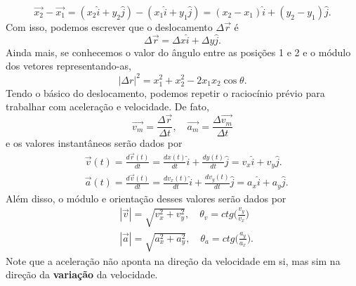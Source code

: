 \documentclass{article}
\begin{document}
    $$
    \vec{x_{2}} - \vec{x_{1}} = (x_{2}\hat{i} + y_{2}\hat{j}) - (x_{1}\hat{i}+y_{1}\hat{j}) = (x_{2}-x_{1})\hat{i} + (y_{2}-y_{1})\hat{j}.
    $$
    Com isso, podemos escrever que o deslocamento $\Delta \vec{r}$ \'e 
      $$
      \Delta \vec{r} = \Delta x\hat{i} + \Delta y\hat{j}.
      $$
    Ainda mais, se conhecemos o valor do \^angulo entre as posi\c c\~oes 1 e 2 e o m\'odulo dos vetores representando-as, 
      $$
        |\Delta r|^{2} = x_{1}^{2} + x_{2}^{2} - 2x_{1}x_{2}\cos{\theta}.
      $$
    Tendo o b\'asico do deslocamento, podemos repetir o racioc\'inio pr\'evio para trabalhar com acelera\c c\~ao e velocidade. De fato, 
      $$
        \vec{v_{m}} = \frac{\Delta \vec{r}}{\Delta t}, \quad \vec{a_{m}} = \frac{\Delta \vec{v_{m}}}{\Delta t}
      $$
      e os valores instant\^aneos ser\~ao dados por 
      \begin{align*}
        &\vec{v}(t) = \frac{d \vec{r}(t)}{dt} = \frac{d x(t)}{dt}\hat{i} + \frac{d y(t)}{dt}\hat{j} = v_{x}\hat{i} + v_{y}\hat{j}.\\
        &\vec{a}(t) = \frac{d \vec{v}(t)}{dt} = \frac{d v_{x}(t)}{dt}\hat{i} + \frac{d v_{y}(t)}{dt}\hat{j} = a_{x}\hat{i} + a_{y}\hat{j}.
      \end{align*}
      Al\'em disso, o m\'odulo e orienta\c c\~ao desses valores ser\~ao dados por 
     \begin{align*}
       &|\vec{v}| = \sqrt{v_{x}^{2}+v_{y}^{2}},\quad \theta_{v} = ctg\biggl(\frac{v_{y}}{v_{x}}\biggr)\\
       &|\vec{a}| = \sqrt{a_{x}^{2}+a_{y}^{2}},\quad \theta_{a} = ctg\biggl(\frac{a_{y}}{a_{x}}\biggr).
     \end{align*}
     Note que a acelera\c c\~ao n\~ao aponta na dire\c c\~ao da velocidade em si, mas sim na dire\c c\~ao da \textbf{varia\c c\~ao} da velocidade.
\end{document}
